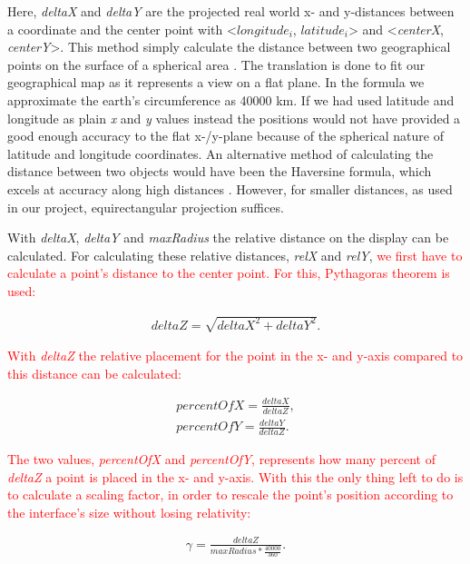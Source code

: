 Here, \textit{deltaX} and \textit{deltaY} are the projected real world x- and y-distances between a coordinate and the center point with <$longitude_i$, $latitude_i$> and <\textit{centerX}, \textit{centerY}>. This method simply calculate the distance between two geographical points on the surface of a spherical area \cite{equi}. The translation is done to fit our geographical map as it represents a view on a flat plane. In the formula we approximate the earth's circumference as 40000 km. If we had used latitude and longitude as plain \textit{x} and \textit{y} values instead the positions would not have provided a good enough accuracy to the flat x-/y-plane because of the spherical nature of latitude and longitude coordinates. An alternative method of calculating the distance between two objects would have been the Haversine formula, which excels at accuracy along high distances \cite{haversine}. However, for smaller distances, as used in our project, equirectangular projection suffices.

With \textit{deltaX}, \textit{deltaY} and \textit{maxRadius} the relative distance on the display can be calculated. For calculating these relative distances, \textit{relX} and \textit{relY}, \textcolor{red}{we first have to calculate a point's distance to the center point. For this, Pythagoras theorem is used:}

\begin{align*}
deltaZ = \sqrt{deltaX^2 + deltaY^2}.
\end{align*}

\textcolor{red}{With \textit{deltaZ} the relative placement for the point in the x- and y-axis compared to this distance can be calculated:}

\begin{align}
\label{eq:percent}
percentOfX = \frac{deltaX}{deltaZ}, \\
percentOfY = \frac{deltaY}{deltaZ}. \nonumber
\end{align}

\textcolor{red}{The two values,  \textit{percentOfX} and \textit{percentOfY},  represents how many percent of \textit{deltaZ} a point is placed in the x- and y-axis. With this the only thing left to do is to calculate a scaling factor, in order to rescale the point's position according to the interface's size without losing relativity:} 

\begin{align*}
\gamma = \frac{deltaZ}{maxRadius*\frac{40000}{360}}.
\end{align*}

